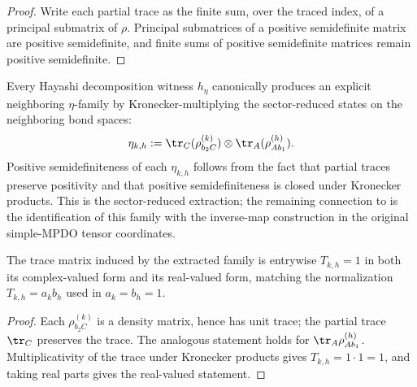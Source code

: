\begin{proof}
    \leanok
    Write each partial trace as the finite sum, over the traced index, of a
    principal submatrix of $\rho$. Principal submatrices of a positive
    semidefinite matrix are positive semidefinite, and finite sums of positive
    semidefinite matrices remain positive semidefinite.
\end{proof}

\begin{definition}
    \label{def:mpdo_eta_of_hayashi_markov}
    \leanok
    Every Hayashi decomposition witness $h_\eta$ canonically produces an
    explicit neighboring $\eta$-family by Kronecker-multiplying the
    sector-reduced states on the neighboring bond spaces:
    \[
        \eta_{k,h}
        := \tr_C(\rho_{b_2 C}^{(k)})
        \otimes \tr_A(\rho_{A b_1}^{(h)}).
    \]
    Positive semidefiniteness of each $\eta_{k,h}$ follows from the fact
    that partial traces preserve positivity and that positive
    semidefiniteness is closed under Kronecker products. This is the
    sector-reduced extraction; the remaining connection to
    \cite[Appendix~C.2]{Cirac2016MPDO_arXiv} is the identification of this
    family with the inverse-map
    construction in the original simple-MPDO tensor coordinates.
\end{definition}

\begin{theorem}
    \label{thm:mpdo_eta_of_hayashi_markov_trace_matrix}
    \leanok
    The trace matrix induced by the extracted family is entrywise
    $T_{k,h} = 1$ in both its complex-valued form and its real-valued form,
    matching the normalization $T_{k,h} = a_k b_h$ used in
    $a_k = b_h = 1$.
\end{theorem}

\begin{proof}
    \leanok
    Each $\rho_{b_2 C}^{(k)}$ is a density matrix, hence has unit trace; the
    partial trace $\tr_C$ preserves the trace. The analogous statement holds
    for $\tr_A \rho_{A b_1}^{(h)}$. Multiplicativity of the trace under
    Kronecker products gives $T_{k,h} = 1 \cdot 1 = 1$, and taking real parts
    gives the real-valued statement.
\end{proof}

